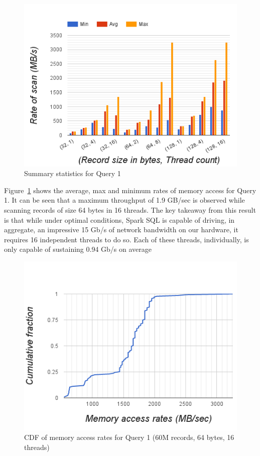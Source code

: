 \documentclass{sig-alternate-05-2015}
\begin{document}
\begin{figure}[h]
\centering
\includegraphics[width=\columnwidth]{mem-scan-summary-statistics}
\caption{\label{fig:stat_query1}Summary statistics for Query 1}
\end{figure}

Figure~\ref{fig:stat_query1} shows the average, max and minimum rates of memory
access for Query 1. It can be seen that a maximum throughput of 1.9 GB/sec is
observed while scanning records of size 64 bytes in 16 threads.  The key
takeaway from this result is that while under optimal conditions, Spark SQL is
capable of driving, in aggregate, an impressive 15 Gb/s of network bandwidth on
our hardware, it requires 16 independent threads to do so.  Each of these
threads, individually, is only capable of sustaining 0.94 Gb/s on average

\begin{figure}[h]
\centering
\includegraphics[width=\columnwidth]{cdf-mem-access-rates-count-64bytes-16threads}
\caption{\label{fig:mem_query1}CDF of memory access rates for Query 1 (60M records, 64 bytes, 16 threads)}
\end{figure}
\end{document}
